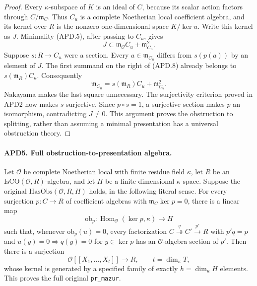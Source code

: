 \begin{proof}
Every \(\kappa\)-subspace of \(K\) is an ideal of \(C\),
because its scalar action factors through \(C/\mathfrak m_C\).
Thus \(C_u\) is a complete Noetherian local coefficient algebra,
and its kernel over \(R\) is the nonzero one-dimensional space
\(K/\ker u\).  Write this kernel as \(J\).
Minimality (APD.5), after passing to \(C_u\), gives
\[
 J\subset\mathfrak m_{\mathcal O}C_u+\mathfrak m_{C_u}^2.
                                                               \tag{APD.8}
\]
Suppose \(s:R\to C_u\) were a section.  Every
\(a\in\mathfrak m_{C_u}\) differs from \(s(p(a))\) by an
element of \(J\).  The first summand on the right of (APD.8)
already belongs to \(s(\mathfrak m_R)C_u\).  Consequently
\[
 \mathfrak m_{C_u}=s(\mathfrak m_R)C_u+\mathfrak m_{C_u}^2.
\]
Nakayama makes the last square unnecessary.  The surjectivity
criterion proved in APD2 now makes \(s\) surjective.  Since
\(p\circ s=1\), a surjective section makes \(p\) an
isomorphism, contradicting \(J\ne0\).  This argument proves
the obstruction to splitting, rather than assuming a minimal
presentation has a universal obstruction theory.
\end{proof}

\paragraph{APD5. Full obstruction-to-presentation algebra.}
\label{claim:APD5}
Let \(\mathcal O\) be complete Noetherian local with finite
residue field \(\kappa\), let \(R\) be an
\(\mathrm{IsCO}(\mathcal O,R)\)-algebra, and let \(H\) be
a finite-dimensional \(\kappa\)-space.  Suppose the original
\(\mathrm{HasObs}(\mathcal O,R,H)\) holds, in the following
literal sense.  For every surjection \(p:C\to R\) of coefficient
algebras with \(\mathfrak m_C\ker p=0\), there is a linear map
\[
 \mathrm{ob}_p:\operatorname{Hom}_{\mathcal O}(\ker p,\kappa)
                      \longrightarrow H                 \tag{APD.9}
\]
such that, whenever \(\mathrm{ob}_p(u)=0\), every factorization
\(C\overset q\twoheadrightarrow C'\overset{p'}\longrightarrow R\)
with \(p'q=p\) and
\(u(y)=0\Rightarrow q(y)=0\) for \(y\in\ker p\)
has an \(\mathcal O\)-algebra section of \(p'\).
Then there is a surjection
\[
 \mathcal O[[X_1,\ldots,X_t]]\longrightarrow R,
 \qquad t=\dim_\kappa T,
                                                               \tag{APD.10}
\]
whose kernel is generated by a specified family of exactly
\(h=\dim_\kappa H\) elements.  This proves the full original
\texttt{pr\_mazur}.

